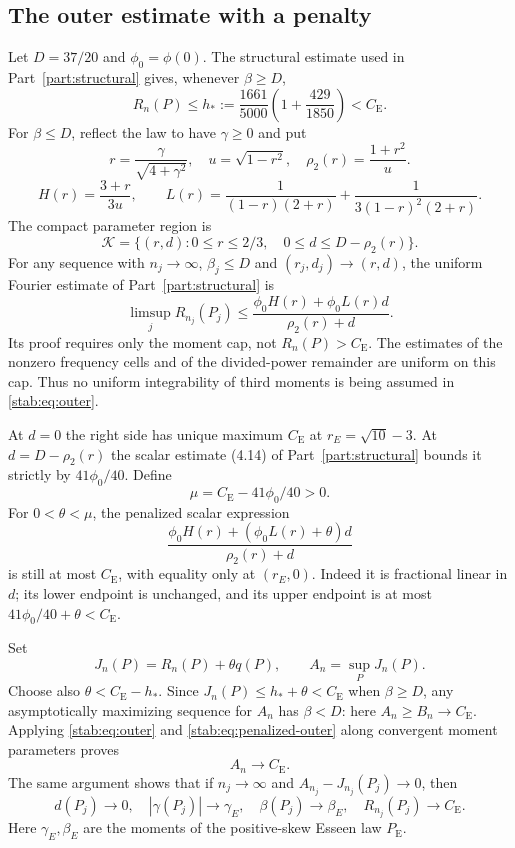 \documentclass[11pt,a4paper]{article}
\numberwithin{equation}{section}
\theoremstyle{definition}
\theoremstyle{remark}
\newcommand{\CE}{C_{\mathrm E}}
\newcommand{\PE}{P_{\mathrm E}}
\begin{document}
\subsection{The outer estimate with a penalty}

Let $D=37/20$ and $\phi_0=\phi(0)$. The structural estimate used in
Part~\ref{part:structural} gives, whenever $\beta\ge D$,
\begin{equation}\label{stab:eq:cap}
 R_n(P)\le h_*:=\frac{1661}{5000}
             \left(1+\frac{429}{1850}\right)<\CE.
\end{equation}
For $\beta\le D$, reflect the law to have $\gamma\ge0$ and put
\[
 r=\frac{\gamma}{\sqrt{4+\gamma^2}},\quad u=\sqrt{1-r^2},\quad
 \rho_2(r)=\frac{1+r^2}{u}.
\]
\[
 H(r)=\frac{3+r}{3u},\qquad
 L(r)=\frac1{(1-r)(2+r)}+\frac1{3(1-r)^2(2+r)}.
\]
The compact parameter region is
\[
 \mathcal K=\{(r,d):0\le r\le2/3,\quad
                    0\le d\le D-\rho_2(r)\}.
\]
For any sequence with $n_j\to\infty$, $\beta_j\le D$ and
$(r_j,d_j)\to(r,d)$, the uniform Fourier estimate of Part~\ref{part:structural} is
\begin{equation}\label{stab:eq:outer}
 \limsup_j R_{n_j}(P_j)
       \le\frac{\phi_0 H(r)+\phi_0 L(r)d}{\rho_2(r)+d}.
\end{equation}
Its proof requires only the moment cap, not $R_n(P)>\CE$.
The estimates of the nonzero frequency cells and of the divided-power
remainder are uniform on this cap. Thus no uniform integrability
of third moments is being assumed in \eqref{stab:eq:outer}.

At $d=0$ the right side has unique maximum $\CE$ at
$r_E=\sqrt{10}-3$. At $d=D-\rho_2(r)$ the scalar estimate (4.14)
of Part~\ref{part:structural} bounds it strictly by $41\phi_0/40$. Define
\[
                   \mu=\CE-41\phi_0/40>0.
\]
For $0<\theta<\mu$, the penalized scalar expression
\begin{equation}\label{stab:eq:penalized-outer}
 \frac{\phi_0 H(r)+(\phi_0 L(r)+\theta)d}{\rho_2(r)+d}
\end{equation}
is still at most $\CE$, with equality only at $(r_E,0)$.
Indeed it is fractional linear in $d$; its lower endpoint is unchanged,
and its upper endpoint is at most $41\phi_0/40+\theta<\CE$.

Set
\[
 J_n(P)=R_n(P)+\theta q(P),\qquad A_n=\sup_P J_n(P).
\]
Choose also $\theta<\CE-h_*$. Since $J_n(P)\le h_*+\theta<\CE$
when $\beta\ge D$, any asymptotically maximizing sequence for
$A_n$ has $\beta<D$: here $A_n\ge B_n\to\CE$.
Applying \eqref{stab:eq:outer} and \eqref{stab:eq:penalized-outer} along
convergent moment parameters proves
\begin{equation}\label{stab:eq:A-limit}
 A_n\longrightarrow\CE.
\end{equation}
The same argument shows that if $n_j\to\infty$ and
$A_{n_j}-J_{n_j}(P_j)\to0$, then
\begin{equation}\label{stab:eq:penalty-outer-stability}
 d(P_j)\to0,\quad |\gamma(P_j)|\to\gamma_E,\quad
 \beta(P_j)\to\beta_E,\quad R_{n_j}(P_j)\to\CE.
\end{equation}
Here $\gamma_E,\beta_E$ are the moments of the positive-skew
Esseen law $\PE$.
\end{document}
